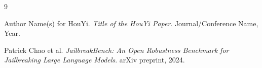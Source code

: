 \documentclass[10pt, a4paper]{article}
\begin{document}


\begin{thebibliography}{9}

Author Name(s) for HouYi.
\textit{Title of the HouYi Paper}.
Journal/Conference Name, Year.

Patrick Chao et al.
\textit{JailbreakBench: An Open Robustness Benchmark for Jailbreaking Large Language Models}.
arXiv preprint, 2024.

\end{thebibliography}
\end{document}
